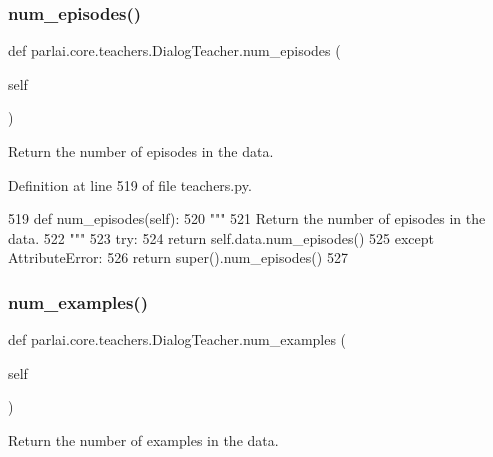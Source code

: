 \subsubsection{\texorpdfstring{num\+\_\+episodes()}{num\_episodes()}}
{\footnotesize\ttfamily def parlai.\+core.\+teachers.\+Dialog\+Teacher.\+num\+\_\+episodes (\begin{DoxyParamCaption}\item[{}]{self }\end{DoxyParamCaption})}

\begin{DoxyVerb}Return the number of episodes in the data.
\end{DoxyVerb}
 

Definition at line 519 of file teachers.\+py.


\begin{DoxyCode}
519     \textcolor{keyword}{def }num\_episodes(self):
520         \textcolor{stringliteral}{"""}
521 \textcolor{stringliteral}{        Return the number of episodes in the data.}
522 \textcolor{stringliteral}{        """}
523         \textcolor{keywordflow}{try}:
524             \textcolor{keywordflow}{return} self.data.num\_episodes()
525         \textcolor{keywordflow}{except} AttributeError:
526             \textcolor{keywordflow}{return} super().num\_episodes()
527 
\end{DoxyCode}
\mbox{\label{classparlai_1_1core_1_1teachers_1_1DialogTeacher_ad90c8cac27f2db22db77e29828b94dfe}} 
\subsubsection{\texorpdfstring{num\+\_\+examples()}{num\_examples()}}
{\footnotesize\ttfamily def parlai.\+core.\+teachers.\+Dialog\+Teacher.\+num\+\_\+examples (\begin{DoxyParamCaption}\item[{}]{self }\end{DoxyParamCaption})}

\begin{DoxyVerb}Return the number of examples in the data.
\end{DoxyVerb}
 

